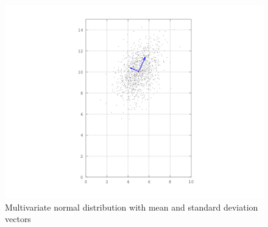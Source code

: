 \documentclass[paper=a4, fontsize=11pt]{scrartcl} %
\begin{document}
\begin{figure}[h]
    \includegraphics[width=1\columnwidth]{ex03_graph}
    \caption{Multivariate normal distribution with mean and standard deviation
        vectors}\label{fig:dist}
\end{figure}
\end{document}
